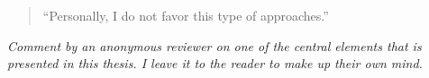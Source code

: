 \thispagestyle{empty}
\vspace*{\fill}


\begin{quote}
   ``Personally, I do not favor this type of approaches.''
\end{quote}

\begin{flushright}
    \textit{Comment by an anonymous reviewer on one of the central elements that is presented in this thesis. I leave it to the reader to make up their own mind.}
\end{flushright} 
